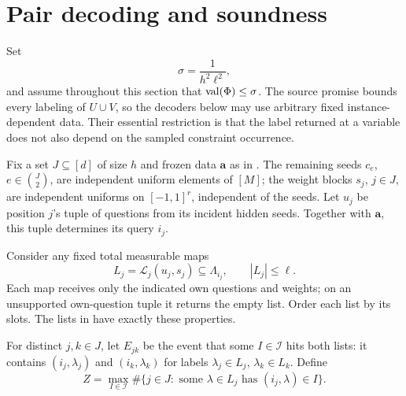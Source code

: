\section{Pair decoding and soundness}
\label{dec:section}

Set
\begin{equation}
 \sigma=\frac1{h^2\ell^2},
 \label{src:decoding-soundness}
\end{equation}
and assume throughout this section that \(\operatorname{val}(\Phi)\leq\sigma\).
The source promise bounds every labeling of \(U\cup V\), so the
decoders below may use arbitrary fixed instance-dependent data.
Their essential restriction is that the label returned at a variable
does not also depend on the sampled constraint occurrence.

Fix a set \(J\subseteq[d]\) of size \(h\) and frozen data
\(\mathbf a\) as in . The remaining
seeds \(c_e\), \(e\in\binom J2\), are independent uniform
elements of \([M]\); the weight blocks \(s_j\), \(j\in J\),
are independent uniforms on \([-1,1]^r\), independent of the
seeds. Let \(u_j\) be position \(j\)'s tuple of questions from
its incident hidden seeds. Together with \(\mathbf a\), this
tuple determines its query \(i_j\).

Consider any fixed total measurable maps
\begin{equation}
 L_j=\mathcal L_j(u_j,s_j)\subseteq\Lambda_{i_j},
 \qquad |L_j|\leq\ell.
 \label{dec:local_lists}
\end{equation}
Each map receives only the indicated own questions and weights;
on an unsupported own-question tuple it returns the empty list.
Order each list by its slots. The lists in  have
exactly these properties.

For distinct \(j,k\in J\), let \(E_{jk}\) be the event that
some \(I\in\mathcal I\) hits both lists: it contains
\((i_j,\lambda_j)\) and \((i_k,\lambda_k)\) for labels
\(\lambda_j\in L_j\), \(\lambda_k\in L_k\). Define
\begin{equation}
 Z=\max_{I\in\mathcal I}
       \#\{j\in J:\text{ some }\lambda\in L_j
                              \text{ has }(i_j,\lambda)\in I\}.
 \label{dec:hits}
\end{equation}


